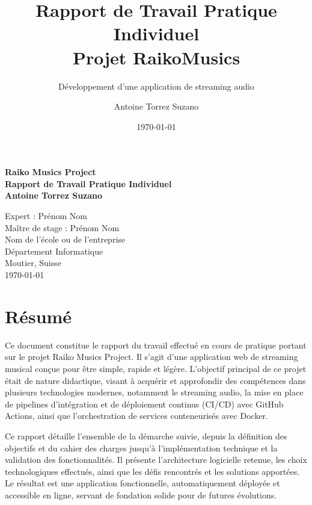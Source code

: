 \documentclass[12pt,a4paper]{article} %
\title{Rapport de Travail Pratique Individuel\\ \vspace{0.5cm} \Large Projet RaikoMusics}
\author{Antoine Torrez Suzano}
\date{\today}
\subtitle{Développement d'une application de streaming audio}
\begin{document}
\begin{titlepage}
    \centering
    \vspace*{1cm}
    
    
    \Huge\bfseries Raiko Musics Project\\[0.5cm]
    \Large Rapport de Travail Pratique Individuel\\[2cm]
    
    \Large Antoine Torrez Suzano \\[2cm]
    
    \vfill %
    
    \large
    Expert : Prénom Nom \\
    Maître de stage : Prénom Nom \\[1cm]
    
    Nom de l'école ou de l'entreprise\\
    Département Informatique\\
    Moutier, Suisse\\[1cm]
    
    \today
\end{titlepage}

\vspace{\fill}

\newpage
\section*{Résumé}

Ce document constitue le rapport du travail effectué en cours de pratique portant sur le projet Raiko Musics Project. Il s'agit d'une application web de streaming musical conçue pour être simple, rapide et légère. L'objectif principal de ce projet était de nature didactique, visant à acquérir et approfondir des compétences dans plusieurs technologies modernes, notamment le streaming audio, la mise en place de pipelines d'intégration et de déploiement continus (CI/CD) avec GitHub Actions, ainsi que l'orchestration de services conteneurisés avec Docker.

Ce rapport détaille l'ensemble de la démarche suivie, depuis la définition des objectifs et du cahier des charges jusqu'à l'implémentation technique et la validation des fonctionnalités. Il présente l'architecture logicielle retenue, les choix technologiques effectués, ainsi que les défis rencontrés et les solutions apportées. Le résultat est une application fonctionnelle, automatiquement déployée et accessible en ligne, servant de fondation solide pour de futures évolutions.
\end{document}

